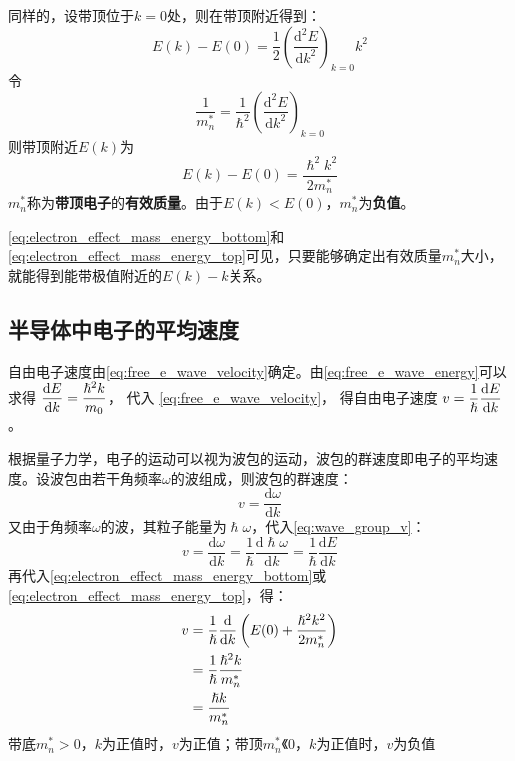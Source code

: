 同样的，设带顶位于$k=0$处，则在带顶附近得到：
\begin{equation}
    E(k)-E(0)=\frac{1}{2}\left(\frac{\mathrm{d^2}E}{\mathrm{d}k^2}\right)_{k=0}k^2
\end{equation}
令
\begin{equation*}
    \frac{1}{m_n^*}=\frac{1}{\hslash^2}\left(\frac{\mathrm{d}^2E}{\mathrm{d}k^2}\right)_{k=0}
\end{equation*}
则带顶附近$E(k)$为
\begin{equation}
    E(k)-E(0)=\frac{\hslash^2k^2}{2m_n^*}\label{eq:electron_effect_mass_energy_top}
\end{equation}
$m_n^*$称为\textbf{带顶电子}的\textbf{有效质量}。由于$E(k)<E(0)$，$m_n^*$为\textbf{负值}。

\autoref{eq:electron_effect_mass_energy_bottom}和\autoref{eq:electron_effect_mass_energy_top}可见，只要能够确定出有效质量$m_n^*$大小，就能得到能带极值附近的$E(k)-k$关系。

\subsection{半导体中电子的平均速度}

\vspace{1ex}自由电子速度由\autoref{eq:free_e_wave_velocity}确定。由\autoref{eq:free_e_wave_energy}可以求得 $\displaystyle\frac{\mathrm{d}E}{\mathrm{d}k}=\frac{\hslash^2k}{m_0}$，
代入
\autoref{eq:free_e_wave_velocity}，
\vspace{1ex}得自由电子速度 $\displaystyle v=\frac{1}{\hslash}\frac{\mathrm{d}E}{\mathrm{d}k}$。

根据量子力学，电子的运动可以视为波包的运动，波包的群速度即电子的平均速度。设波包由若干角频率$\omega$的波组成，则波包的群速度：
\begin{equation}
    v=\frac{\mathrm{d}\omega}{\mathrm{d}k}\label{eq:wave_group_v}
\end{equation}
又由于角频率$\omega$的波，其粒子能量为$\hslash\omega$，代入\autoref{eq:wave_group_v}：
\begin{equation}
    v=\frac{\mathrm{d}\omega}{\mathrm{d}k}=\frac{1}{\hslash}\frac{\mathrm{d}\hslash\omega}{\mathrm{d}k}=\frac{1}{\hslash}\frac{\mathrm{d}E}{\mathrm{d}k}\label{eq:semi_velocity_energy_relation}
\end{equation}
再代入\autoref{eq:electron_effect_mass_energy_bottom}或\autoref{eq:electron_effect_mass_energy_top}，得：
\begin{align}
    v&=\frac{1}{\hslash}\frac{\mathrm{d}}{\mathrm{d}k}\left(E(0)+\frac{\hslash^2k^2}{2m_n^*}\right)\notag\\
    &=\frac{1}{\hslash}\frac{\hslash^2k}{m_n^*}\notag\\
    &=\frac{\hslash k}{m_n^*}\label{eq:semi_velocity_k_m_eff_relation}
\end{align}
带底$m_n^*>0$，$k$为正值时，$v$为正值；带顶$m_n^*《0$，$k$为正值时，$v$为负值

